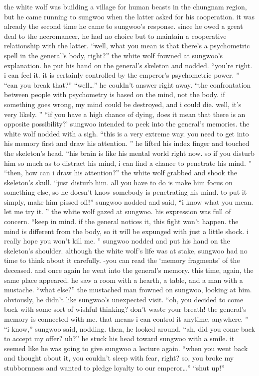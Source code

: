 the white wolf was building a village for human beasts in the chungnam region, but he came running to sungwoo when the latter asked for his cooperation.
 it was already the second time he came to sungwoo’s response.
 since he owed a great deal to the necromancer, he had no choice but to maintain a cooperative relationship with the latter.
 “well, what you mean is that there’s a psychometric spell in the general’s body, right?” the white wolf frowned at sungwoo’s explanation.
 he put his hand on the general’s skeleton and nodded.
 “you’re right.
 i can feel it.
 it is certainly controlled by the emperor’s psychometric power.
” “can you break that?” “well…” he couldn’t answer right away.
 “the confrontation between people with psychometry is based on the mind, not the body.
 if something goes wrong, my mind could be destroyed, and i could die.
 well, it’s very likely.
” “if you have a high chance of dying, does it mean that there is an opposite possibility?’ sungwoo intended to peek into the general’s memories.
 the white wolf nodded with a sigh.
 “this is a very extreme way.
 you need to get into his memory first and draw his attention.
” he lifted his index finger and touched the skeleton’s head.
 “his brain is like his mental world right now.
 so if you disturb him so much as to distract his mind, i can find a chance to penetrate his mind.
” “then, how can i draw his attention?” the white wolf grabbed and shook the skeleton’s skull.
 “just disturb him.
 all you have to do is make him focus on something else, so he doesn’t know somebody is penetrating his mind.
 to put it simply, make him pissed off!” sungwoo nodded and said, “i know what you mean.
 let me try it.
” the white wolf gazed at sungwoo.
 his expression was full of concern.
 “keep in mind.
 if the general notices it, this fight won’t happen.
 the mind is different from the body, so it will be expunged with just a little shock.
 i really hope you won’t kill me.
” sungwoo nodded and put his hand on the skeleton’s shoulder.
 although the white wolf’s life was at stake, sungwoo had no time to think about it carefully.
 -you can read the ‘memory fragments’ of the deceased.
 and once again he went into the general’s memory.
 this time, again, the same place appeared.
 he saw a room with a hearth, a table, and a man with a mustache.
 “what else?” the mustached man frowned on sungwoo, looking at him.
 obviously, he didn’t like sungwoo’s unexpected visit.
 “oh, you decided to come back with some sort of wishful thinking? don’t waste your breath! the general’s memory is connected with me.
 that means i can control it anytime, anywhere.
” “i know,” sungwoo said, nodding.
 then, he looked around.
 “ah, did you come back to accept my offer? uh?” he stuck his head toward sungwoo with a smile.
 it seemed like he was going to give sungwoo a lecture again.
 “when you went back and thought about it, you couldn’t sleep with fear, right? so, you broke my stubbornness and wanted to pledge loyalty to our emperor…” “shut up!”

 